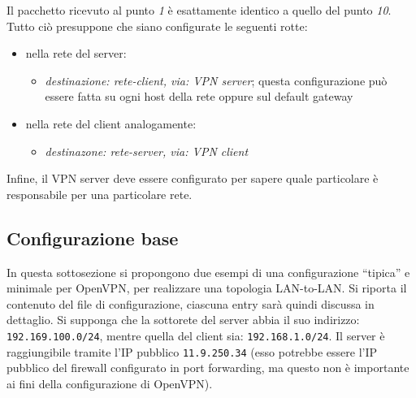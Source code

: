 Il pacchetto ricevuto al punto \textit{1} è esattamente identico a quello del
punto \textit{10}.
Tutto ciò presuppone che siano configurate le seguenti rotte:
\begin{itemize}
  \item nella rete del server:
  \begin{itemize}
    \item \textit{destinazione: rete-client, via: VPN server}; questa configurazione
    può essere fatta su ogni host della rete oppure sul default gateway
  \end{itemize}
  \item nella rete del client analogamente:
  \begin{itemize}
    \item \textit{destinazone: rete-server, via: VPN client}
  \end{itemize}
\end{itemize}
Infine, il VPN server deve essere configurato per sapere quale particolare è
responsabile per una particolare rete.


\subsection{Configurazione base}
In questa sottosezione si propongono due esempi di una configurazione ``tipica''
e minimale per OpenVPN, per realizzare una topologia LAN-to-LAN. Si riporta il
contenuto del file di configurazione, ciascuna entry sarà quindi discussa in dettaglio.
Si supponga che la sottorete del server abbia il suo indirizzo: \texttt{192.169.100.0/24},
mentre quella del client sia: \texttt{192.168.1.0/24}. Il server è raggiungibile
tramite l'IP pubblico \texttt{11.9.250.34} (esso potrebbe essere l'IP pubblico del firewall
configurato in port forwarding, ma questo non è importante ai fini della configurazione
di OpenVPN).

